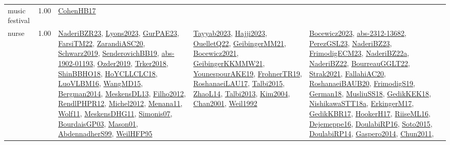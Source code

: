 {\begin{longtable}{p{3cm}r>{\raggedright\arraybackslash}p{6cm}>{\raggedright\arraybackslash}p{6cm}>{\raggedright\arraybackslash}p{8cm}}
\index{music festival}\index{ApplicationAreas!music festival}music festival &  1.00 & \hyperref[detail:CohenHB17]{CohenHB17} &  & \\
\index{nurse}\index{ApplicationAreas!nurse}nurse &  1.00 & \hyperref[detail:NaderiBZR23]{NaderiBZR23}, \hyperref[detail:Lyons2023]{Lyons2023}, \hyperref[detail:GurPAE23]{GurPAE23}, \hyperref[detail:FarsiTM22]{FarsiTM22}, \hyperref[detail:ZarandiASC20]{ZarandiASC20}, \hyperref[detail:Schwarz2019]{Schwarz2019}, \hyperref[detail:SenderovichBB19]{SenderovichBB19}, \hyperref[detail:abs-1902-01193]{abs-1902-01193}, \hyperref[detail:Ozder2019]{Ozder2019}, \hyperref[detail:Trker2018]{Trker2018}, \hyperref[detail:ShinBBHO18]{ShinBBHO18}, \hyperref[detail:HoYCLLCLC18]{HoYCLLCLC18}, \hyperref[detail:LuoVLBM16]{LuoVLBM16}, \hyperref[detail:WangMD15]{WangMD15}, \hyperref[detail:Bergman2014]{Bergman2014}, \hyperref[detail:MeskensDL13]{MeskensDL13}, \hyperref[detail:Filho2012]{Filho2012}, \hyperref[detail:RendlPHPR12]{RendlPHPR12}, \hyperref[detail:Michel2012]{Michel2012}, \hyperref[detail:Menana11]{Menana11}, \hyperref[detail:Wolf11]{Wolf11}, \hyperref[detail:MeskensDHG11]{MeskensDHG11}, \hyperref[detail:Simonis07]{Simonis07}, \hyperref[detail:BourdaisGP03]{BourdaisGP03}, \hyperref[detail:Mason01]{Mason01}, \hyperref[detail:AbdennadherS99]{AbdennadherS99}, \hyperref[detail:WeilHFP95]{WeilHFP95} & \hyperref[detail:Tayyab2023]{Tayyab2023}, \hyperref[detail:Hajji2023]{Hajji2023}, \hyperref[detail:OuelletQ22]{OuelletQ22}, \hyperref[detail:GeibingerMM21]{GeibingerMM21}, \hyperref[detail:Bocewicz2021]{Bocewicz2021}, \hyperref[detail:GeibingerKKMMW21]{GeibingerKKMMW21}, \hyperref[detail:YounespourAKE19]{YounespourAKE19}, \hyperref[detail:FrohnerTR19]{FrohnerTR19}, \hyperref[detail:RoshanaeiLAU17]{RoshanaeiLAU17}, \hyperref[detail:Talbi2015]{Talbi2015}, \hyperref[detail:ZhaoL14]{ZhaoL14}, \hyperref[detail:Talbi2013]{Talbi2013}, \hyperref[detail:Kim2004]{Kim2004}, \hyperref[detail:Chan2001]{Chan2001}, \hyperref[detail:Weil1992]{Weil1992} & \hyperref[detail:Bocewicz2023]{Bocewicz2023}, \hyperref[detail:abs-2312-13682]{abs-2312-13682}, \hyperref[detail:PerezGSL23]{PerezGSL23}, \hyperref[detail:NaderiBZ23]{NaderiBZ23}, \hyperref[detail:FrimodigECM23]{FrimodigECM23}, \hyperref[detail:NaderiBZ22a]{NaderiBZ22a}, \hyperref[detail:NaderiBZ22]{NaderiBZ22}, \hyperref[detail:BourreauGGLT22]{BourreauGGLT22}, \hyperref[detail:Strak2021]{Strak2021}, \hyperref[detail:FallahiAC20]{FallahiAC20}, \hyperref[detail:RoshanaeiBAUB20]{RoshanaeiBAUB20}, \hyperref[detail:FrimodigS19]{FrimodigS19}, \hyperref[detail:German18]{German18}, \hyperref[detail:MusliuSS18]{MusliuSS18}, \hyperref[detail:GedikKEK18]{GedikKEK18}, \hyperref[detail:NishikawaSTT18a]{NishikawaSTT18a}, \hyperref[detail:ErkingerM17]{ErkingerM17}, \hyperref[detail:GedikKBR17]{GedikKBR17}, \hyperref[detail:HookerH17]{HookerH17}, \hyperref[detail:RiiseML16]{RiiseML16}, \hyperref[detail:Dejemeppe16]{Dejemeppe16}, \hyperref[detail:DoulabiRP16]{DoulabiRP16}, \hyperref[detail:Soto2015]{Soto2015}, \hyperref[detail:DoulabiRP14]{DoulabiRP14}, \hyperref[detail:Gaspero2014]{Gaspero2014}, \hyperref[detail:Chun2011]{Chun2011}, 
\end{longtable}}
